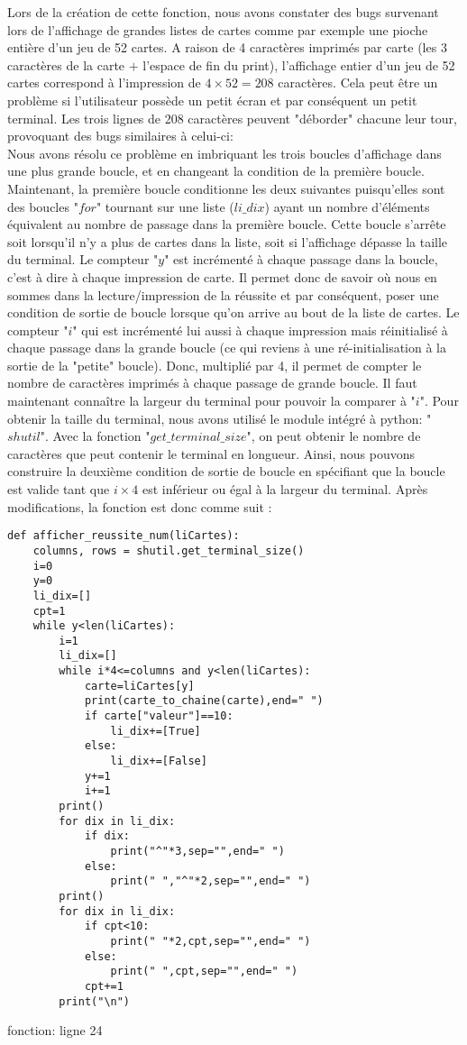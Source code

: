 \documentclass[10pt,a4paper,french,titlepage]{article}
\begin{document}
Lors de la création de cette fonction, nous avons constater des bugs survenant lors de l'affichage de grandes listes de cartes comme par exemple une pioche entière d'un jeu de 52 cartes. A raison de 4 caractères imprimés par carte (les 3 caractères de la carte $+$ l'espace de fin du print), l'affichage entier d'un jeu de 52 cartes correspond à l'impression de $4\times52=208$ caractères. Cela peut être un problème si l'utilisateur possède un petit écran et par conséquent un petit terminal. Les trois lignes de 208 caractères peuvent "déborder" chacune leur tour, provoquant des bugs similaires à  celui-ci:\\

Nous avons résolu ce problème en imbriquant les trois boucles d'affichage dans une plus grande boucle, et en changeant la condition de la première boucle. Maintenant, la première boucle conditionne les deux suivantes puisqu'elles sont des boucles "$for$" tournant sur une liste ($li\_dix$) ayant un nombre  d'éléments équivalent au nombre de passage dans la première boucle. Cette boucle s'arrête soit lorsqu'il n'y a plus de cartes dans la liste, soit si l'affichage dépasse la taille du terminal. Le compteur "$y$" est incrémenté à chaque passage dans la boucle, c'est à dire à chaque impression de carte. Il permet donc de savoir où nous en sommes dans la lecture/impression de la réussite et par conséquent, poser une condition de sortie de boucle lorsque qu'on arrive au bout de la liste de cartes. Le compteur "$i$" qui est incrémenté lui aussi à chaque impression mais réinitialisé à chaque passage dans la grande  boucle (ce qui reviens à une ré-initialisation à la sortie de la "petite" boucle). Donc, multiplié par 4, il permet de compter le nombre de caractères imprimés à chaque passage de grande boucle. Il faut maintenant connaître la largeur du terminal pour pouvoir la comparer à "$i$". Pour obtenir la taille du terminal, nous avons utilisé le module intégré à python: "$shutil$". Avec la fonction "$get\_terminal\_size$", on peut obtenir le nombre de caractères que peut  contenir le terminal en longueur. Ainsi, nous pouvons construire la deuxième condition de sortie de boucle en spécifiant que la boucle est valide tant que $i \times 4$ est inférieur ou égal à la largeur du terminal. Après modifications, la fonction est donc comme suit :
\begin{lstlisting}
def afficher_reussite_num(liCartes):
    columns, rows = shutil.get_terminal_size()
    i=0
    y=0
    li_dix=[]
    cpt=1
    while y<len(liCartes):
        i=1
        li_dix=[]
        while i*4<=columns and y<len(liCartes): 
            carte=liCartes[y]
            print(carte_to_chaine(carte),end=" ")
            if carte["valeur"]==10:
                li_dix+=[True]
            else:
                li_dix+=[False]
            y+=1
            i+=1
        print()
        for dix in li_dix:
            if dix:
                print("^"*3,sep="",end=" ")
            else:
                print(" ","^"*2,sep="",end=" ")
        print()
        for dix in li_dix:
            if cpt<10:
                print(" "*2,cpt,sep="",end=" ")
            else:
                print(" ",cpt,sep="",end=" ")
            cpt+=1
        print("\n")
\end{lstlisting}
\caption{fonction: ligne 24}
\end{document}
